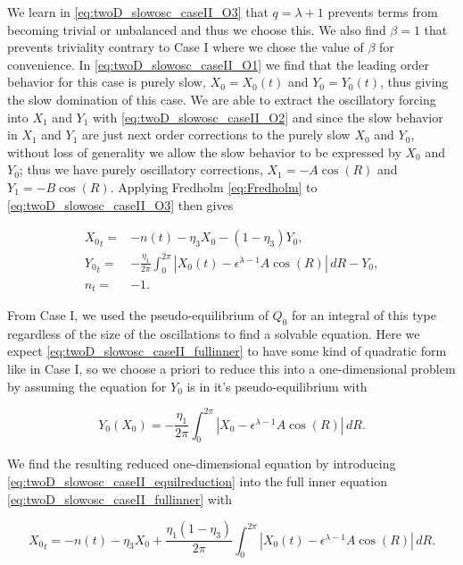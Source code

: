 We learn in \eqref{eq:twoD_slowosc_caseII_O3} that $q=\lambda+1$ prevents terms from becoming trivial or unbalanced and thus we choose this. We also find $\beta =1$ that prevents triviality contrary to Case I where we chose the value of $\beta$ for convenience. In \eqref{eq:twoD_slowosc_caseII_O1} we find that the leading order behavior for this case is purely slow, $X_0=X_0(t)$ and $Y_0=Y_0(t)$, thus giving the slow domination of this case. We are able to extract the oscillatory forcing into $X_1$ and $Y_1$ with \eqref{eq:twoD_slowosc_caseII_O2} and since the slow behavior in $X_1$ and $Y_1$ are just next order corrections to the purely slow $X_0$ and $Y_0$, without loss of generality we allow the slow behavior to be expressed by $X_0$ and $Y_0$; thus we have purely oscillatory corrections, $X_1=-A\cos(R)$ and $Y_1=-B\cos(R)$. Applying Fredholm \eqref{eq:Fredholm} to \eqref{eq:twoD_slowosc_caseII_O3} then gives

\begin{equation}\label{eq:twoD_slowosc_caseII_fullinner}
\begin{aligned}
{X_0}_t =& -n(t) -\eta_3 X_0- (1-\eta_3)Y_0,\\
{Y_0}_t =& -\frac{\eta_1}{2\pi}\int_0^{2\pi}|X_0(t)-\epsilon^{\lambda-1}A\cos(R)|\,dR -Y_0,\\
n_t=& -1.
\end{aligned}
\end{equation}

From Case I, we used the pseudo-equilibrium of $Q_0$ for an integral of this type regardless of the size of the oscillations to find a solvable equation. Here we expect \eqref{eq:twoD_slowosc_caseII_fullinner} to have some kind of quadratic form like in Case I, so we choose a priori to reduce this into a one-dimensional problem by assuming the equation for $Y_0$ is in it's pseudo-equilibrium with

\begin{equation}\label{eq:twoD_slowosc_caseII_equilreduction}
{Y_0}(X_0)= -\frac{\eta_1}{2\pi}\int_0^{2\pi}|X_0-\epsilon^{\lambda-1}A\cos(R)|\,dR.
\end{equation}

We find the resulting reduced one-dimensional equation by introducing \eqref{eq:twoD_slowosc_caseII_equilreduction} into the full inner equation \eqref{eq:twoD_slowosc_caseII_fullinner} with

\begin{equation}\label{eq:twoD_slowosc_caseII_reducedeq}
{X_0}_t = -n(t)-\eta_3 X_0+\frac{\eta_1(1-\eta_3)}{2\pi}\int_0^{2\pi}|X_0(t)-\epsilon^{\lambda-1}A\cos(R)|\,dR.
\end{equation}

